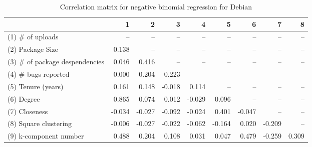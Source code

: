 \begin{table}[H]
\caption{Correlation matrix for negative binomial regression for Debian}
\label{corr_table_nbinomial}
\begin{center}
\begin{tabular}{lrrrrrrrr}
\toprule
{} &      1 &      2 &      3 &      4 &      5 &      6 &      7 &     8 \\
\midrule
(1) \# of uploads               &    -- &    -- &    -- &    -- &    -- &    -- &    -- &   -- \\
(2) Package Size               &  0.138 &    -- &    -- &    -- &    -- &    -- &    -- &   -- \\
(3) \# of package despendencies &  0.046 &  0.416 &    -- &    -- &    -- &    -- &    -- &   -- \\
(4) \# bugs reported            &  0.000 &  0.204 &  0.223 &    -- &    -- &    -- &    -- &   -- \\
(5) Tenure (years)             &  0.161 &  0.148 & -0.018 &  0.114 &    -- &    -- &    -- &   -- \\
(6) Degree                     &  0.865 &  0.074 &  0.012 & -0.029 &  0.096 &    -- &    -- &   -- \\
(7) Closeness                  & -0.034 & -0.027 & -0.092 & -0.024 &  0.401 & -0.047 &    -- &   -- \\
(8) Square clustering          & -0.006 & -0.027 & -0.022 & -0.062 & -0.164 &  0.020 & -0.209 &   -- \\
(9) k-component number         &  0.488 &  0.204 &  0.108 &  0.031 &  0.047 &  0.479 & -0.259 & 0.309 \\
\bottomrule
\end{tabular}
\end{center} 
\end{table}
